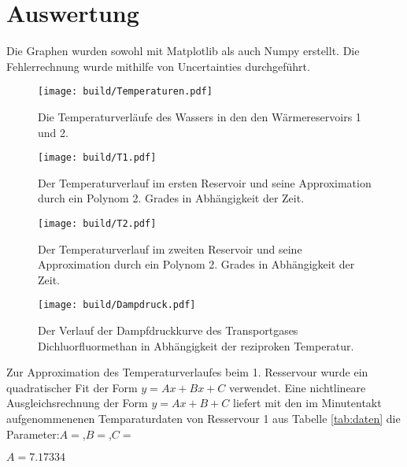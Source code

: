 \section{Auswertung}
\label{sec:Auswertung}
Die Graphen wurden sowohl mit Matplotlib als auch Numpy erstellt. Die
 Fehlerrechnung wurde mithilfe von Uncertainties durchgeführt.
 \begin{figure}
 	\centering
 	\caption{Die Temperaturverläufe des Wassers in den den Wärmereservoirs 1 und 2.}
 	\texttt{[image: build/Temperaturen.pdf]}
 	\label{fig:Graph1}
 \end{figure}
 \begin{figure}
 	\centering
 	\caption{Der Temperaturverlauf im ersten Reservoir und seine Approximation durch ein Polynom 2. Grades in Abhängigkeit der Zeit.}
 	\texttt{[image: build/T1.pdf]}
 	\label{fig:Graph1}
 \end{figure}
 \begin{figure}
 	\centering
 	\caption{Der Temperaturverlauf im zweiten Reservoir und seine Approximation durch ein Polynom 2. Grades in Abhängigkeit der Zeit.}
 	\texttt{[image: build/T2.pdf]}
 	\label{fig:Graph1}
 \end{figure}
 \begin{figure}
 	\centering
 	\caption{Der Verlauf der Dampfdruckkurve des Transportgases Dichluorfluormethan in Abhängigkeit der reziproken Temperatur.}
 	\texttt{[image: build/Dampdruck.pdf]}
 	\label{fig:Graph1}
 \end{figure}




 Zur Approximation des Temperaturverlaufes beim 1. Resservour wurde ein
 quadratischer Fit der Form $y = Ax+Bx+C$ verwendet. Eine nichtlineare
 Ausgleichsrechnung der Form $y = Ax+B+C$ liefert mit den im Minutentakt
 aufgenommenenen Temparaturdaten von Resservour 1 aus Tabelle \ref{tab:daten}
 die Parameter:$A = $,$B = $,$C =$

 \begin{table}
   \centering
   \label{tab:daten}
 \end{table}

 \begin{table}
   \centering
   \label{tab:daten}
 \end{table}
$A = 7.17334$

